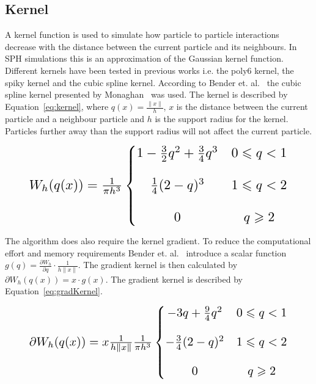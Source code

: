 \subsection{Kernel} \label{kernel}
    A kernel function is used to simulate how particle to particle interactions decrease with the distance between the current particle and its neighbours.
    In SPH simulations this is an approximation of the Gaussian kernel function.
    Different kernels have been tested in previous works i.e. the poly6 kernel, the spiky kernel and the cubic spline kernel.
    According to Bender et. al.~\cite{bender} the cubic spline kernel presented by Monaghan~\cite{monaghan} was used.
    The kernel is described by Equation~\ref{eq:kernel}, where $q(x)=\frac{\left \| x \right \|}{h}$, $x$ is the distance between the current particle and a neighbour particle and $h$ is the support radius for the kernel.
    Particles further away than the support radius will not affect the current particle.

    \begin{equation} \label{eq:kernel}
        \resizebox{0.88\linewidth}{!}{$
        W_h(q(x)) =  \frac{1}{\pi h^3} \left\{\begin{matrix}
        1 - \frac{3}{2}q^2 + \frac{3}{4}q^3 & 0 \leqslant q < 1 \\ 
        \\
        \frac{1}{4}(2-q)^3 & 1 \leqslant q < 2\\ 
        \\
        0 & q \geqslant 2
        \end{matrix}\right.
        $}
    \end{equation}

    The algorithm does also require the kernel gradient.
    To reduce the computational effort and memory requirements Bender et. al.~\cite{bender} introduce a scalar function $g(q) = \frac{\partial W_h}{\partial q} \cdot \frac{1}{h \left \| x \right \|}$.
    The gradient kernel is then calculated by $\partial W_h(q(x)) = x \cdot g(x)$.
    The gradient kernel is described by Equation~\ref{eq:gradKernel}.


    \begin{equation} \label{eq:gradKernel}
        \resizebox{0.88\linewidth}{!}{$
        \partial W_h(q(x)) =  x \frac{1}{h \left \| x \right \|} \frac{1}{\pi h^3} \left\{\begin{matrix}
        - 3q + \frac{9}{4}q^2 & 0 \leqslant q < 1 \\ 
        \\
        - \frac{3}{4}(2-q)^2 & 1 \leqslant q < 2\\ 
        \\
        0 & q \geqslant 2
        \end{matrix}\right.
        $}
    \end{equation}

